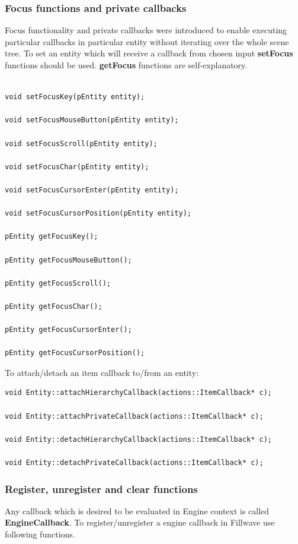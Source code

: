 \documentclass{article}
\begin{document}
\subsubsection{Focus functions and private callbacks}\label{sec:Focus functions and private callbacks}
\indent \indent Focus functionality and private callbacks were introduced to enable executing particular callbacks in particular entity without iterating over the whole scene tree. To set an entity which will receive a callback from chosen input \textbf{setFocus} functions should be used. \textbf{getFocus} functions are self-explanatory.
\newline

\begin{lstlisting}

void setFocusKey(pEntity entity);

void setFocusMouseButton(pEntity entity);

void setFocusScroll(pEntity entity);

void setFocusChar(pEntity entity);

void setFocusCursorEnter(pEntity entity);

void setFocusCursorPosition(pEntity entity);
   
pEntity getFocusKey();

pEntity getFocusMouseButton();

pEntity getFocusScroll();

pEntity getFocusChar();

pEntity getFocusCursorEnter();

pEntity getFocusCursorPosition();

\end{lstlisting}
   
\indent \indent To attach/detach an item callback to/from an entity:

\begin{lstlisting}
void Entity::attachHierarchyCallback(actions::ItemCallback* c);

void Entity::attachPrivateCallback(actions::ItemCallback* c);

void Entity::detachHierarchyCallback(actions::ItemCallback* c);

void Entity::detachPrivateCallback(actions::ItemCallback* c);   \end{lstlisting}

\subsubsection{Register, unregister and clear functions}\label{sec:register functions}
\indent \indent Any callback which is desired to be evaluated in Engine context is called \textbf{EngineCallback}. To register/unregister a engine callback in Fillwave use following functions.
\end{document}
